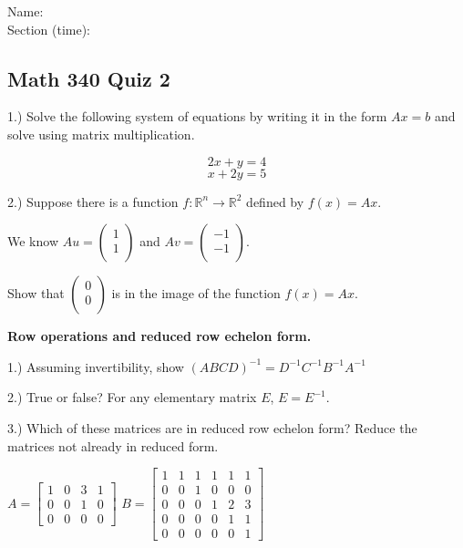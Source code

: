 \documentclass{article}
\begin{document}
Name:\\
\medskip
Section (time):

\subsection*{Math 340 Quiz 2}


1.) Solve the following system of equations by writing it in the form $Ax=b$ and solve using matrix multiplication.

$$2x+y=4$$
$$x+2y=5$$

2.) Suppose there is a function $f:\mathbb{R}^n \rightarrow \mathbb{R}^2$ defined by $f(x)=Ax$.  

We know $Au=\left(\begin{array}{c}
1 \\
1 \\
\end{array}\right)$ and $Av=\left(\begin{array}{c}
-1 \\
-1 \\
\end{array}\right)$. 

Show that $\left(\begin{array}{c}
0 \\
0 \\
\end{array}\right)$ is in the image of the function $f(x)=Ax$. 

\pagebreak

\textbf{Row operations and reduced row echelon form.}

\bigskip{}

1.) Assuming invertibility, show $(ABCD)^{-1}=D^{-1}C^{-1}B^{-1}A^{-1}$
\smallskip

2.) True or false? For any elementary matrix $E$, $E=E^{-1}$.

\smallskip

3.) Which of these matrices are in reduced row echelon form? Reduce the matrices not already in reduced form.
\smallskip

$A= \left[\begin{array}{cccc}
1 & 0 & 3 & 1 \\
0 & 0 & 1 & 0 \\
0 & 0 & 0 & 0
\end{array}\right]$ $B= \left[\begin{array}{cccccc}
1 & 1 & 1 & 1 & 1 & 1\\
0 & 0 & 1 & 0 & 0 & 0\\
0 & 0 & 0 & 1 & 2 & 3\\
0 & 0 & 0 & 0 & 1 & 1\\
0 & 0 & 0 & 0 & 0 & 1
\end{array}\right]$ 
\end{document}
